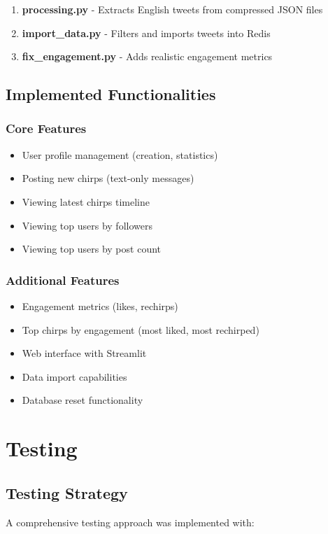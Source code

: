 \documentclass[a4paper,11pt]{article}
\begin{document}
\begin{enumerate}
    \item \textbf{processing.py} - Extracts English tweets from compressed JSON files
    \item \textbf{import\_data.py} - Filters and imports tweets into Redis
    \item \textbf{fix\_engagement.py} - Adds realistic engagement metrics
\end{enumerate}

\subsection{Implemented Functionalities}

\subsubsection{Core Features}
\begin{itemize}
    \item User profile management (creation, statistics)
    \item Posting new chirps (text-only messages)
    \item Viewing latest chirps timeline
    \item Viewing top users by followers
    \item Viewing top users by post count
\end{itemize}

\subsubsection{Additional Features}
\begin{itemize}
    \item Engagement metrics (likes, rechirps)
    \item Top chirps by engagement (most liked, most rechirped)
    \item Web interface with Streamlit
    \item Data import capabilities
    \item Database reset functionality
\end{itemize}

\newpage
\section{Testing}

\subsection{Testing Strategy}
A comprehensive testing approach was implemented with:
\end{document}
